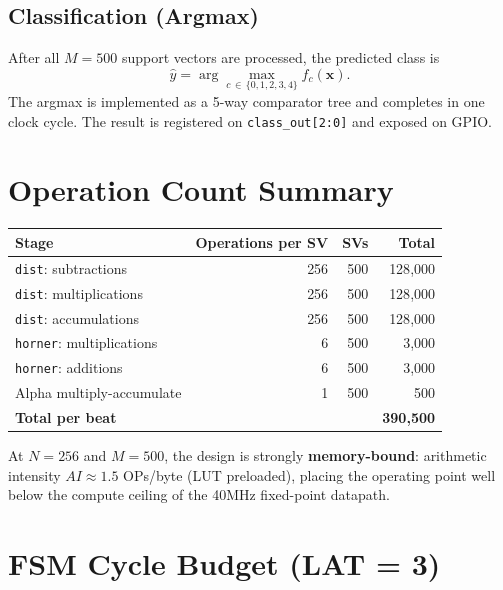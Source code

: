 \documentclass[11pt]{article}
\begin{document}
\subsection{Classification (Argmax)}

After all \(M = 500\) support vectors are processed, the predicted class is
\[
    \hat{y} = \arg\max_{c \,\in\, \{0,1,2,3,4\}} f_c(\mathbf{x}).
\]
The argmax is implemented as a 5-way comparator tree and completes in one
clock cycle. The result is registered on \texttt{class\_out[2:0]} and
exposed on GPIO.

\section{Operation Count Summary}

\begin{center}
\begin{tabular}{lrrr}
\toprule
\textbf{Stage} & \textbf{Operations per SV} & \textbf{SVs} & \textbf{Total} \\
\midrule
\texttt{dist}: subtractions & 256 & 500 & 128{,}000 \\
\texttt{dist}: multiplications & 256 & 500 & 128{,}000 \\
\texttt{dist}: accumulations & 256 & 500 & 128{,}000 \\
\texttt{horner}: multiplications & 6 & 500 & 3{,}000 \\
\texttt{horner}: additions & 6 & 500 & 3{,}000 \\
Alpha multiply-accumulate & 1 & 500 & 500 \\
\midrule
\textbf{Total per beat} & & & \textbf{390{,}500} \\
\bottomrule
\end{tabular}
\end{center}

\vspace{0.3em}
At \(N = 256\) and \(M = 500\), the design is strongly
\textbf{memory-bound}: arithmetic intensity \(AI \approx 1.5\)
OPs/byte (LUT preloaded), placing the operating point well below
the compute ceiling of the 40\;MHz fixed-point datapath.

\section{FSM Cycle Budget (LAT = 3)}
\end{document}
